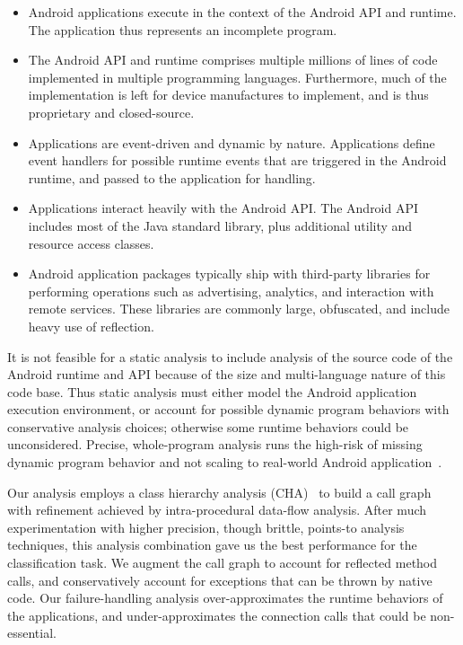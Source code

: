 \begin{itemize}[leftmargin=0.5cm]\setlength{\itemsep}{-0.05in}

\item Android applications execute in the context of the Android API
  and runtime.  The application thus represents an incomplete program.
  
\item The Android API and runtime comprises multiple millions of lines of
  code implemented in multiple programming languages.  Furthermore,
  much of the implementation is left for device manufactures to
  implement, and is thus proprietary and closed-source. 

\item Applications are event-driven and dynamic by nature.
  Applications define event handlers for possible runtime events that
  are triggered in the Android runtime, and passed to the application
  for handling. 

\item Applications interact heavily with the Android API.  The Android
  API includes most of the Java standard library, plus additional
  utility and resource access classes.

\item Android application packages typically ship with third-party
  libraries for performing operations such as advertising, analytics,
  and interaction with remote services.  These libraries are commonly
  large, obfuscated, and include heavy use of reflection.

\end{itemize}

It is not feasible for a static analysis to include analysis of the
source code of the Android runtime and API because of the size and
multi-language nature of this code base.  Thus static analysis must
either model the Android application execution environment, or account
for possible dynamic program behaviors with conservative analysis
choices; otherwise some runtime behaviors could be unconsidered.
Precise, whole-program analysis runs the high-risk of missing dynamic
program behavior and not scaling to real-world Android
application~\cite{Gordon:Kim:Perkins:Gilham:Nguyen:Rinard:NDSS15}.

Our analysis employs a class hierarchy analysis (CHA)~\cite{Dean1995}
to build a call graph with refinement achieved by intra-procedural
data-flow analysis.  After much experimentation with higher precision,
though brittle, points-to analysis techniques, this analysis
combination gave us the best performance for the classification task.
We augment the call graph to account for reflected method calls, and
conservatively account for exceptions that can be thrown by native
code.  Our failure-handling analysis over-approximates the runtime
behaviors of the applications, and under-approximates the connection
calls that could be non-essential.

